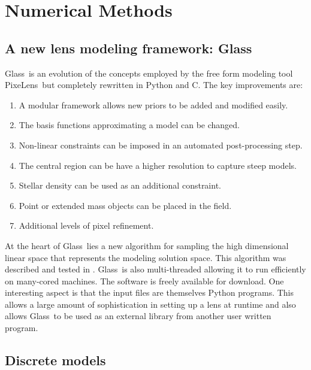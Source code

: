 \documentclass[onecolumn,galley]{mn2e}
\newcommand{\Glass}{{\sc Glass}}
\newcommand{\PixeLens}{{\sc PixeLens}}
\begin{document}
\section{Numerical Methods} 

\subsection{A new lens modeling framework: \Glass}

\Glass\ is an evolution of the concepts employed by the free form modeling tool
\PixeLens\ but completely rewritten in Python and C. The key improvements are:
\begin{enumerate}
  \item A modular framework allows new priors to be added and modified easily.
  \item The basis functions approximating a model can be changed. 
  \item Non-linear constraints can be imposed in an automated post-processing step. 
  \item The central region can be have a higher resolution to capture steep models. 
  \item Stellar density can be used as an additional constraint.  
  \item Point or extended mass objects can be placed in the field.
  \item Additional levels of pixel refinement.
\end{enumerate}
At the heart of \Glass\ lies a new algorithm for sampling the high dimensional
linear space that represents the modeling solution space. This algorithm was
described and tested in \cite{}. \Glass\ is also multi-threaded allowing it to
run efficiently on many-cored machines.  The software is freely available for
download. One interesting aspect is that the input files are themselves Python
programs. This allows a large amount of sophistication in setting up a lens at
runtime and also allows \Glass\ to be used as an external library from another
user written program.

\subsection{Discrete models}
\end{document}
